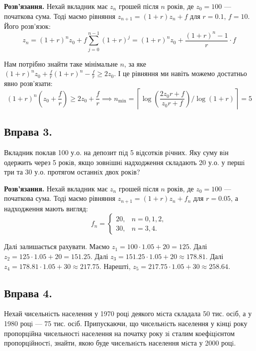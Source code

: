 \documentclass{hw_template}
\begin{document}
\textbf{Розв'язання.} Нехай вкладник має $z_n$ грошей після $n$ років, де $z_0=100$ --- початкова сума. Тоді маємо рівняння $z_{n+1}=(1+r)z_n + f$ для $r=0.1$, $f=10$. Його розв'язок:
\begin{equation*}
    z_n = (1+r)^nz_0 + f\sum_{j=0}^{n-1}(1+r)^j = (1+r)^nz_0 + \frac{(1+r)^{n}-1}{r}\cdot f
\end{equation*}

Нам потрібно знайти таке мінімальне $n$, за яке $(1+r)^nz_0 + \frac{f}{r}(1+r)^n - \frac{f}{r} \geq 2z_0$. І це рівняння ми навіть можемо достатньо явно розв'язати:
\begin{equation*}
    (1+r)^n\left(z_0 + \frac{f}{r}\right) \geq 2z_0 + \frac{f}{r} \implies n_{\min} = \left\lceil \log\left(\frac{2z_0r + f}{z_0r + f}\right) \big/ \log(1+r) \right\rceil = 5
\end{equation*}

\subsection{Вправа 3.}
\begin{problem}
    Вкладник поклав 100 у.о. на депозит пiд 5 вiдсоткiв рiчних. Яку суму вiн одержить через 5 рокiв, якщо зовнiшнi надходження складають 20 у.о. у першi три та 30 у.о. протягом останнiх двох рокiв?
\end{problem}

\textbf{Розв'язання.} Нехай вкладник має $z_n$ грошей після $n$ років, де $z_0=100$ --- початкова сума. Тоді маємо рівняння $z_{n+1}=(1+r)z_n + f_n$ для $r=0.05$, а надходження мають вигляд:
\begin{equation*}
    f_n = \begin{cases}
        20, & n=0,1,2, \\
        30, & n=3,4.
    \end{cases}
\end{equation*}

Далі залишається рахувати. Маємо $z_1=100 \cdot 1.05 + 20 = 125$. Далі $z_2 = 125 \cdot 1.05 + 20 = 151.25$. Далі $z_3 = 151.25 \cdot 1.05 + 20 \approx 178.81$. Далі $z_4 = 178.81 \cdot 1.05 + 30 \approx 217.75$. Нарешті, $z_5 = 217.75 \cdot 1.05 + 30 \approx 258.64$.

\subsection{Вправа 4.}
\begin{problem}
    Нехай чисельнiсть населення у 1970 роцi деякого мiста складала 50 тис. осiб, а у 1980 роцi --- 75 тис. осiб. Припускаючи, що чисельнiсть населення у кiнцi року пропорцiйна чисельностi населення на початку року зi сталим коефiцiєнтом пропорцiйностi, знайти, якою буде чисельнiсть населення мiста у 2000 роцi.
\end{problem}
\end{document}
